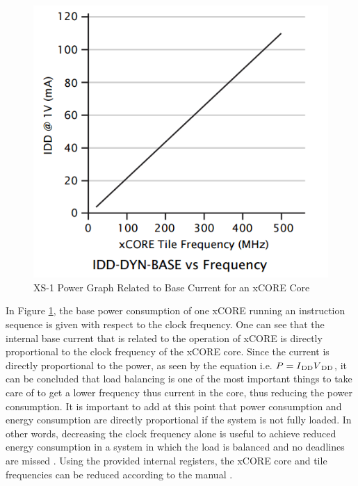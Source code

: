 
\begin{figure}[!ht]
	\centering
	\captionsetup{justification=centering}
	\includegraphics[scale=0.5]{content/images/xs1energy.png}
	\caption{XS-1 Power Graph Related to Base Current for an xCORE Core}
	\label{fig:xs1energy}
\end{figure}

In Figure \ref{fig:xs1energy}, the base power consumption of one xCORE running an instruction sequence is given with respect to the clock frequency. One can see that the internal base current that is related to the operation of xCORE is directly proportional to the clock frequency of the xCORE core. Since the current is directly proportional to the power, as seen by the equation i.e. $P = {I\textsubscript{DD}}  {V\textsubscript{DD}}$, it can be concluded that load balancing is one of the most important things to take care of to get a lower frequency thus current in the core, thus reducing the power consumption. It is important to add at this point that power consumption and energy consumption are directly proportional if the system is not fully loaded. In other words, decreasing the clock frequency alone is useful to achieve reduced energy consumption in a system in which the load is balanced and no deadlines are missed \cite{dvfspaper}. Using the provided internal registers, the xCORE core and tile frequencies can be reduced according to the manual \cite{xs1energymanual}. 

